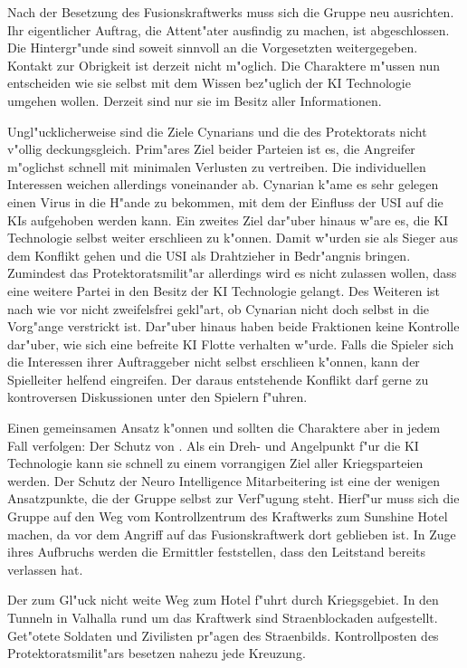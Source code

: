 
Nach der Besetzung des Fusionskraftwerks muss sich die Gruppe neu ausrichten. Ihr eigentlicher Auftrag, die Attent"ater ausfindig zu machen, ist abgeschlossen. Die Hintergr"unde sind soweit sinnvoll an die Vorgesetzten weitergegeben. Kontakt zur Obrigkeit ist derzeit nicht m"oglich. Die Charaktere m"ussen nun entscheiden wie sie selbst mit dem Wissen bez"uglich der KI Technologie umgehen wollen. Derzeit sind nur sie im Besitz aller Informationen. 

Ungl"ucklicherweise sind die Ziele Cynarians und die des Protektorats nicht v"ollig deckungsgleich. Prim"ares Ziel beider Parteien ist es, die Angreifer m"oglichst schnell mit minimalen Verlusten zu vertreiben. Die individuellen Interessen weichen allerdings voneinander ab. Cynarian k"ame es sehr gelegen einen Virus in die H"ande zu bekommen, mit dem der Einfluss der USI auf die KIs aufgehoben werden kann. Ein zweites Ziel dar"uber hinaus w"are es, die KI Technologie selbst weiter erschlie\3en zu k"onnen. Damit w"urden sie als Sieger aus dem Konflikt gehen und die USI als Drahtzieher in Bedr"angnis bringen. Zumindest das Protektoratsmilit"ar allerdings wird es nicht zulassen wollen, dass eine weitere Partei in den Besitz der KI Technologie gelangt. Des Weiteren ist nach wie vor nicht zweifelsfrei gekl"art, ob Cynarian nicht doch selbst in die Vorg"ange verstrickt ist. Dar"uber hinaus haben beide Fraktionen keine Kontrolle dar"uber, wie sich eine befreite KI Flotte verhalten w"urde. Falls die Spieler sich die Interessen ihrer Auftraggeber nicht selbst erschlie\3en k"onnen, kann der Spielleiter helfend eingreifen. Der daraus entstehende Konflikt darf gerne zu kontroversen Diskussionen unter den Spielern f"uhren.

Einen gemeinsamen Ansatz k"onnen und sollten die Charaktere aber in jedem Fall verfolgen: Der Schutz von \ml{}. Als ein Dreh- und Angelpunkt f"ur die KI Technologie kann sie schnell zu einem vorrangigen Ziel aller Kriegsparteien werden. Der Schutz der Neuro Intelligence Mitarbeitering ist eine der wenigen Ansatzpunkte, die der Gruppe selbst zur Verf"ugung steht. Hierf"ur muss sich die Gruppe auf den Weg vom Kontrollzentrum des Kraftwerks zum Sunshine Hotel machen, da \ml{} vor dem Angriff auf das Fusionskraftwerk dort geblieben ist. In Zuge ihres Aufbruchs werden die Ermittler feststellen, dass \xl{} den Leitstand bereits verlassen hat. 

Der zum Gl"uck nicht weite Weg zum Hotel f"uhrt durch Kriegsgebiet. In den Tunneln in Valhalla rund um das Kraftwerk sind Stra\3enblockaden aufgestellt. Get"otete Soldaten und Zivilisten pr"agen des Stra\3enbilds. Kontrollposten des Protektoratsmilit"ars besetzen nahezu jede Kreuzung. 

